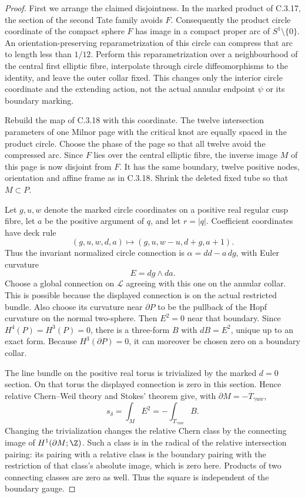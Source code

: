 \begin{proof}
First we arrange the claimed disjointness. In the marked product
of C.3.17, the section of the second Tate family avoids $F$.
Consequently the product circle coordinate of the compact sphere
$F$ has image in a compact proper arc of $S^1\setminus\{0\}$.
An orientation-preserving reparametrization of this circle can
compress that arc to length less than $1/12$. Perform this
reparametrization over a neighbourhood of the central first
elliptic fibre, interpolate through circle diffeomorphisms to the
identity, and leave the outer collar fixed. This changes only the
interior circle coordinate and the extending action, not the
actual annular endpoint $\psi$ or its boundary marking.

Rebuild the map of C.3.18 with this coordinate. The twelve
intersection parameters of one Milnor page with the critical
knot are equally spaced in the product circle. Choose the phase
of the page so that all twelve avoid the compressed arc.
Since $F$ lies over the central elliptic fibre, the inverse image
$M$ of this page is now disjoint from $F$. It has the same
boundary, twelve positive nodes, orientation and affine frame
as in C.3.18. Shrink the deleted fixed tube so that $M\subset P$.

Let $g,u,w$ denote the marked circle coordinates on a positive
real regular cusp fibre, let $a$ be the positive argument of
$q$, and let $r=|q|$. Coefficient coordinates have deck rule
\[
 (g,u,w,d,a)\longmapsto(g,u,w-u,d+g,a+1).
\]
Thus the invariant normalized circle connection is
$\alpha=dd-a\,dg$, with Euler curvature
\[
 E=dg\wedge da.
\]
Choose a global connection on $\mathcal L$ agreeing with this
one on the annular collar. This is possible because the displayed
connection is on the actual restricted bundle. Also choose its
curvature near $\partial P$ to be the pullback of the Hopf
curvature on the normal two-sphere. Then $E^2=0$ near that
boundary. Since $H^4(P)=H^3(P)=0$, there is a three-form $B$
with $dB=E^2$, unique up to an exact form. Because
$H^3(\partial P)=0$, it can moreover be chosen zero on a
boundary collar.

The line bundle on the positive real torus is trivialized by
the marked $d=0$ section. On that torus the displayed connection
is zero in this section. Hence relative Chern--Weil theory and
Stokes' theorem give, with $\partial M=-T_{\gamma uw}$,
\[
 s_\delta=\int_M E^2
          =-\int_{T_{\gamma uw}}B.
\]
Changing the trivialization changes the relative Chern class by
the connecting image of $H^1(\partial M;\Z)$. Such a class is
in the radical of the relative intersection pairing: its
pairing with a relative class is the boundary pairing with the
restriction of that class's absolute image, which is zero here.
Products of two connecting classes are zero as well. Thus the
square is independent of the boundary gauge.


\end{proof}
